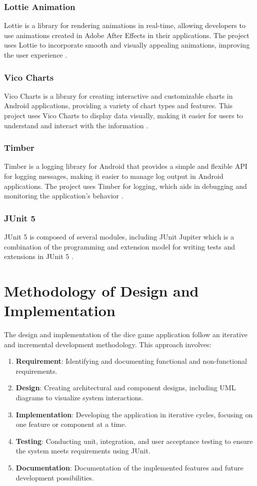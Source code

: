 \subsubsection{Lottie Animation}
Lottie is a library for rendering animations in real-time, allowing developers to use animations created in Adobe After Effects in their applications. The project uses Lottie to incorporate smooth and visually appealing animations, improving the user experience \cite{bib:lottie}.

\subsubsection{Vico Charts}
Vico Charts is a library for creating interactive and customizable charts in Android applications, providing a variety of chart types and features. This project uses Vico Charts to display data visually, making it easier for users to understand and interact with the information \cite{bib:vicocharts}.

\subsubsection{Timber}
Timber is a logging library for Android that provides a simple and flexible API for logging messages, making it easier to manage log output in Android applications. The project uses Timber for logging, which aids in debugging and monitoring the application's behavior \cite{bib:timber}.

\subsubsection{JUnit 5}
JUnit 5 is composed of several modules, including JUnit Jupiter which is a combination of the programming and extension model for writing tests and extensions in JUnit 5 \cite{bib:junit}.

\section{Methodology of Design and Implementation}

The design and implementation of the dice game application follow an iterative and incremental development methodology. This approach involves:
\begin{enumerate}
    \item \textbf{Requirement}: Identifying and documenting functional and non-functional requirements.
    \item \textbf{Design}: Creating architectural and component designs, including UML diagrams to visualize system interactions.
    \item \textbf{Implementation}: Developing the application in iterative cycles, focusing on one feature or component at a time.
    \item \textbf{Testing}: Conducting unit, integration, and user acceptance testing to ensure the system meets requirements using JUnit.
    \item \textbf{Documentation}: Documentation of the implemented features and future development possibilities.
\end{enumerate}

